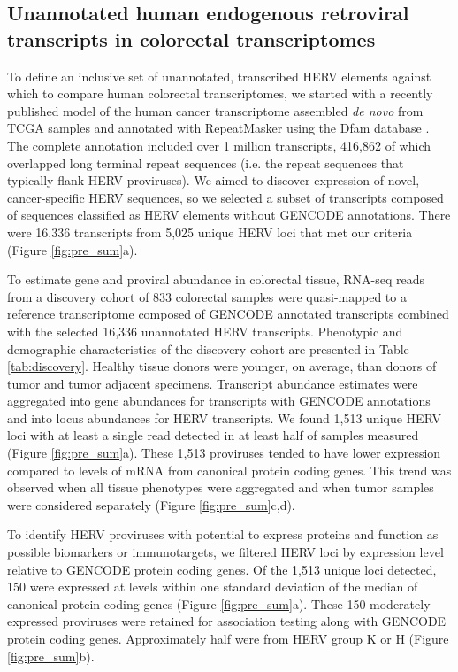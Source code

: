 \subsection*{Unannotated human endogenous retroviral transcripts in colorectal transcriptomes}
To define an inclusive set of unannotated, transcribed HERV elements against which to compare human colorectal transcriptomes, we started with a recently published model of the human cancer transcriptome assembled \emph{de novo} from TCGA samples and annotated with RepeatMasker using the Dfam database \citep{Attig2019}.
The complete annotation included over 1 million transcripts, 416,862 of which overlapped long terminal repeat sequences (i.e. the repeat sequences that typically flank HERV proviruses).
We aimed to discover expression of novel, cancer-specific HERV sequences, so we selected a subset of transcripts composed of sequences classified as HERV elements without GENCODE annotations.
There were 16,336 transcripts from 5,025 unique HERV loci that met our criteria (Figure \ref{fig:pre_sum}a).

To estimate gene and proviral abundance in colorectal tissue, RNA-seq reads from a discovery cohort of 833 colorectal samples were quasi-mapped to a reference transcriptome composed of GENCODE annotated transcripts combined with the selected 16,336 unannotated HERV transcripts.
Phenotypic and demographic characteristics of the discovery cohort are presented in Table \ref{tab:discovery}.
Healthy tissue donors were younger, on average, than donors of tumor and tumor adjacent specimens.
Transcript abundance estimates were aggregated into gene abundances for transcripts with GENCODE annotations and into locus abundances for HERV transcripts.
We found 1,513 unique HERV loci with at least a single read detected in at least half of samples measured (Figure \ref{fig:pre_sum}a).
These 1,513 proviruses tended to have lower expression compared to levels of mRNA from canonical protein coding genes.
This trend was observed when all tissue phenotypes were aggregated and when tumor samples were considered separately (Figure \ref{fig:pre_sum}c,d).

To identify HERV proviruses with potential to express proteins and function as possible biomarkers or immunotargets, we filtered HERV loci by expression level relative to GENCODE protein coding genes.
Of the 1,513 unique loci detected, 150 were expressed at levels within one standard deviation of the median of canonical protein coding genes (Figure \ref{fig:pre_sum}a).
These 150 moderately expressed proviruses were retained for association testing along with GENCODE protein coding genes.
Approximately half were from HERV group K or H (Figure \ref{fig:pre_sum}b).

